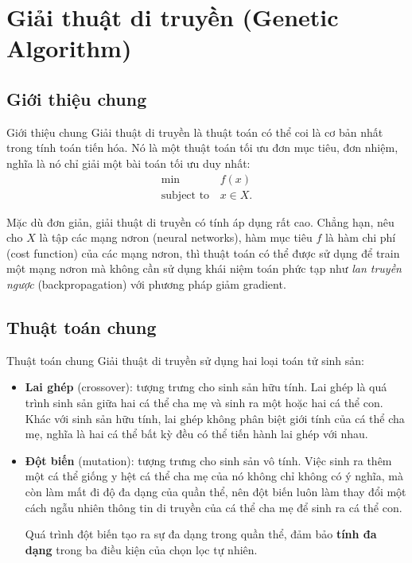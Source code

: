\section{Giải thuật di truyền (Genetic Algorithm)}

\subsection{Giới thiệu chung} %
\label{sub:Giới thiệu chung}

\begin{frame}{Giới thiệu chung}
Giải thuật di truyền là thuật toán có thể coi là cơ bản nhất trong tính toán
tiến hóa. Nó là một thuật toán tối ưu đơn mục tiêu, đơn nhiệm, nghĩa là nó chỉ
giải một bài toán tối ưu duy nhất:
\begin{align*}
  \min&\, f(x)\\
  \text{subject to}&\, x \in X
.\end{align*}

Mặc dù đơn giản, giải thuật di truyền có tính áp dụng rất cao. Chẳng hạn, nêu
cho $X$ là tập các mạng nơron (neural networks), hàm mục tiêu $f$ là hàm chi phí
(cost function) của các mạng nơron, thì thuật toán có thể được sử dụng để train
một mạng nơron mà không cần sử dụng khái niệm toán phức tạp như \textit{lan
truyền ngược} (backpropagation) với phương pháp giảm gradient.
\end{frame}


\subsection{Thuật toán chung} %
\label{sub:Thuật toán chung}

\begin{frame}{Thuật toán chung}
Giải thuật di truyền sử dụng hai loại toán tử sinh sản:

\begin{itemize}
\item \textbf{Lai ghép} (crossover): tượng trưng cho sinh sản hữu tính. Lai ghép
  là quá trình sinh sản giữa hai cá thể cha mẹ và sinh ra một hoặc hai cá thể
  con. Khác với sinh sản hữu tính, lai ghép không phân biệt giới tính của cá thể
  cha mẹ, nghĩa là hai cá thể bất kỳ đều có thể tiến hành lai ghép với nhau.

\item \textbf{Đột biến} (mutation): tượng trưng cho sinh sản vô tính. Việc sinh
  ra thêm một cá thể giống y hệt cá thể cha mẹ của nó không chỉ không có ý
  nghĩa, mà còn làm mất đi độ đa dạng của quần thể, nên đột biến luôn làm thay
  đổi một cách ngẫu nhiên thông tin di truyền của cá thể cha mẹ để sinh ra cá
  thể con.

  Quá trình đột biến tạo ra sự đa dạng trong quần thể, đảm bảo \textbf{tính đa
  dạng} trong ba điều kiện của chọn lọc tự nhiên.
\end{itemize}
\end{frame}


